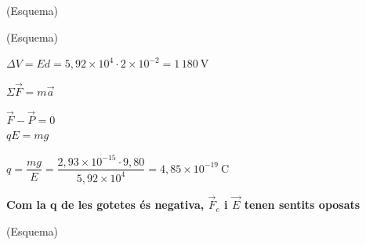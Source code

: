 \begin{solapartat}
 (Esquema)

 (Esquema)

 $\Delta V = Ed = 5,92\times 10^{4}\cdot 2\times 10^{-2} = 1\,180\ \mathrm{V}$
\end{solapartat}

\begin{solapartat}
 $\Sigma\vec{F} = m\vec{a}$

 $\vec{F} - \vec{P} = 0$\\
\hspace*{2.2em}$qE = mg$

 $q = \dfrac{mg}{E} = \dfrac{2,93\times 10^{-15}\cdot 9,80}{5,92\times 10^{4}} = 4,85\times 10^{-19}\ \mathrm{C}$

\textbf{Com la q de les gotetes és negativa, $\vec{F}_e$ i $\vec{E}$ tenen sentits oposats} 

 (Esquema)
\end{solapartat}
